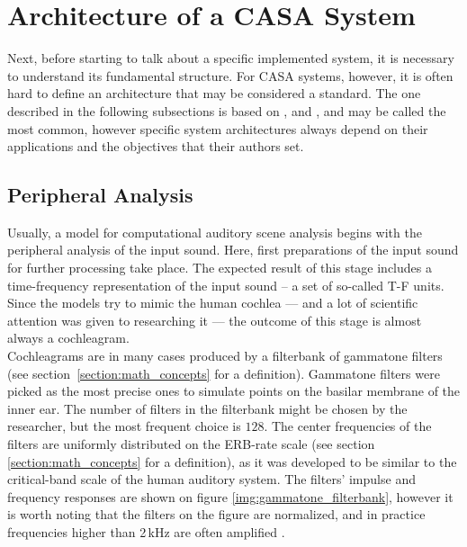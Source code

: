 \section{Architecture of a CASA System}\label{section:casa_architecture}

Next, before starting to talk about a specific implemented system, it is necessary to understand its fundamental structure. For CASA systems, however, it is often hard to define an architecture that may be considered a standard. The one described in the following subsections is based on \cite{Wang2006}, \cite{Wang2012} and \cite{Jasti2020}, and may be called the most common, however specific system architectures always depend on their applications and the objectives that their authors set.

\subsection{Peripheral Analysis}\label{subsection:casa_peripheral_analysis}

Usually, a model for computational auditory scene analysis begins with the peripheral analysis of the input sound. Here, first preparations of the input sound for further processing take place. The expected result of this stage includes a time-frequency representation of the input sound -- a set of so-called T-F units. Since the models try to mimic the human cochlea --- and a lot of scientific attention was given to researching it --- the outcome of this stage is almost always a cochleagram.\\

Cochleagrams are in many cases produced by a filterbank of gammatone filters (see section~\ref{section:math_concepts} for a definition). Gammatone filters were picked as the most precise ones to simulate points on the basilar membrane of the inner ear. The number of filters in the filterbank might be chosen by the researcher, but the most frequent choice is $128$. The center frequencies of the filters are uniformly distributed on the ERB-rate scale (see section \ref{section:math_concepts} for a definition), as it was developed to be similar to the critical-band scale of the human auditory system. The filters' impulse and frequency responses are shown on figure \ref{img:gammatone_filterbank}, however it is worth noting that the filters on the figure are normalized, and in practice frequencies higher than 2\,kHz are often amplified \cite{Wang2006}.\\

